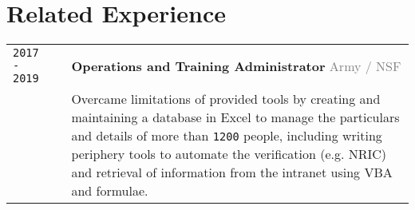 \documentclass[11pt]{article}
\newcommand{\monoSp}[1]{{\usefont{T1}{rbtm}{m}{n} #1}}
\newcommand{\urllinkout}[2]{\href{#1}{\textcolor{text_link}{\small \texttt{#2}}}}
\newcommand{\code}[1]{\monoSp{#1}}
\newcommand{\nummer}[1]{\texttt{\large #1}}
\begin{document}
\section{\textcolor{section_3}{Related Experience}}
\vspace{-\baselineskip}
{
	\renewcommand{\arraystretch}{2}
	\renewcommand{\cellalign}{lt}
	\begin{tabularx}{\textwidth}{@{}l p{0.20cm} X @{}}
		\texttt{\large 2017 - 2019} %
		& & \textbf{Operations and Training Administrator} \hfill \textcolor{gray}{Army / NSF} \\[-0.5em]
		& & {\small Overcame limitations of provided tools by creating and maintaining a database in Excel to manage the particulars and details of more than \nummer{1200} people, including writing periphery tools to automate the verification {\footnotesize(e.g. NRIC)} and retrieval of information from the intranet using \code{VBA} and formulae. }\\

\end{tabularx}}
\end{document}
